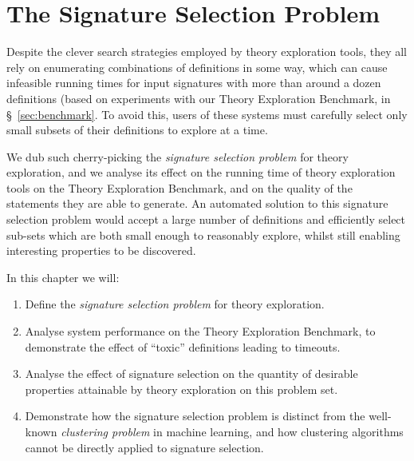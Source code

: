 \chapter{The Signature Selection Problem}
\label{sec:signatureselection}

Despite the clever search strategies employed by theory exploration tools, they
all rely on enumerating combinations of definitions in some way, which can cause
infeasible running times for input signatures with more than around a dozen
definitions (based on experiments with our Theory Exploration Benchmark, in
\S~\ref{sec:benchmark}. To avoid this, users of these systems must carefully
select only small subsets of their definitions to explore at a time.

We dub such cherry-picking the \emph{signature selection problem} for theory
exploration, and we analyse its effect on the running time of theory exploration
tools on the Theory Exploration Benchmark, and on the quality of the statements
they are able to generate. An automated solution to this signature selection
problem would accept a large number of definitions and efficiently select
sub-sets which are both small enough to reasonably explore, whilst still
enabling interesting properties to be discovered.

In this chapter we will:

\begin{enumerate}
  \item Define the \emph{signature selection problem} for theory exploration.
  \item Analyse system performance on the Theory Exploration Benchmark, to
    demonstrate the effect of ``toxic'' definitions leading to timeouts.
  \item Analyse the effect of signature selection on the quantity of desirable
    properties attainable by theory exploration on this problem set.
  \item Demonstrate how the signature selection problem is distinct from the
    well-known \emph{clustering problem} in machine learning, and how clustering
    algorithms cannot be directly applied to signature selection.
\end{enumerate}

\iffalse
TODO: Alison: Are you aiming to produce a set of recommendation for TE
researchers to follow here?

My thoughts: Not really. We are identifying an open problem (our attempt at a
solution turns out not to work :( )
\fi

